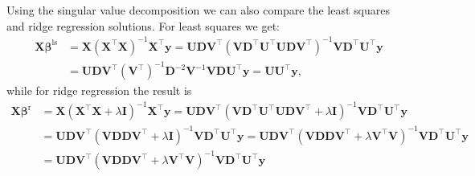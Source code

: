 \documentclass[a4paper, 12pt]{scrartcl}
\newcommand{\bfbeta}{\boldsymbol{\beta}}
\begin{document}
Using the singular value decomposition we can also compare the least squares and ridge regression solutions.
For least squares we get:
\begin{align*}
	\mathbf{X}\bfbeta^\mathrm{ls}&=\mathbf{X}\left(\mathbf{X}^\intercal\mathbf{X}\right)^{-1}\mathbf{X}^\intercal\mathbf{y}
	=\mathbf{U}\mathbf{D}\mathbf{V}^\intercal\left(\mathbf{V}\mathbf{D}^\intercal\mathbf{U}^\intercal\mathbf{U}\mathbf{D}\mathbf{V}^\intercal\right)^{-1}\mathbf{V}\mathbf{D}^\intercal\mathbf{U}^\intercal\mathbf{y}\\
	&=\mathbf{U}\mathbf{D}\mathbf{V}^\intercal\left(\mathbf{V}^\intercal\right)^{-1}\mathbf{D}^{-2}\mathbf{V}^{-1}\mathbf{V}\mathbf{D}\mathbf{U}^\intercal\mathbf{y}
	=\mathbf{U}\mathbf{U}^\intercal\mathbf{y},
\end{align*}
while for ridge regression the result is
\begin{align*}
	\mathbf{X}\bfbeta^\mathrm{r}&=\mathbf{X}\left(\mathbf{X}^\intercal\mathbf{X}+\lambda\mathbf{I}\right)^{-1}\mathbf{X}^\intercal\mathbf{y}
	=\mathbf{U}\mathbf{D}\mathbf{V}^\intercal\left(\mathbf{V}\mathbf{D}^\intercal\mathbf{U}^\intercal\mathbf{U}\mathbf{D}\mathbf{V}^\intercal+\lambda\mathbf{I}\right)^{-1}\mathbf{V}\mathbf{D}^\intercal\mathbf{U}^\intercal\mathbf{y}\\
	&=\mathbf{U}\mathbf{D}\mathbf{V}^\intercal\left(\mathbf{V}\mathbf{D}\mathbf{D}\mathbf{V}^\intercal+\lambda\mathbf{I}\right)^{-1}\mathbf{V}\mathbf{D}^\intercal\mathbf{U}^\intercal\mathbf{y}
	=\mathbf{U}\mathbf{D}\mathbf{V}^\intercal\left(\mathbf{V}\mathbf{D}\mathbf{D}\mathbf{V}^\intercal+\lambda\mathbf{V}^\intercal\mathbf{V}\right)^{-1}\mathbf{V}\mathbf{D}^\intercal\mathbf{U}^\intercal\mathbf{y}\\
	&=\mathbf{U}\mathbf{D}\mathbf{V}^\intercal\left(\mathbf{V}\mathbf{D}\mathbf{D}\mathbf{V}^\intercal+\lambda\mathbf{V}^\intercal\mathbf{V}\right)^{-1}\mathbf{V}\mathbf{D}^\intercal\mathbf{U}^\intercal\mathbf{y}
\end{align*}
\end{document}
